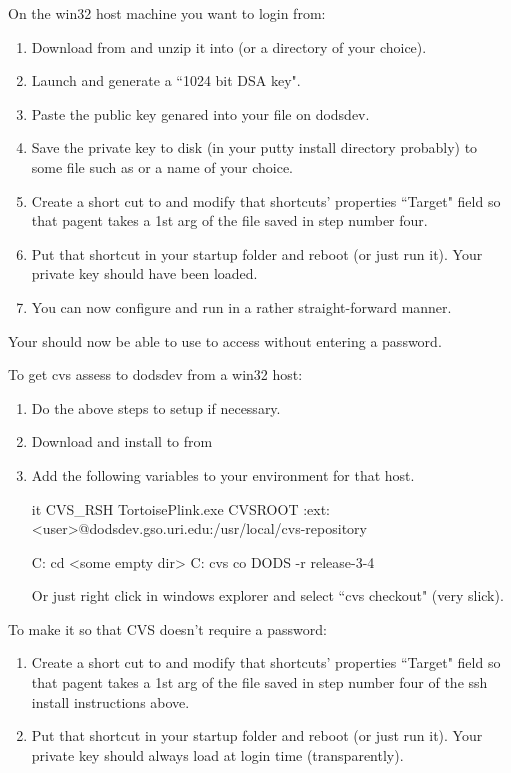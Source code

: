 \documentclass{dods-paper}
\begin{document}
On the win32 host machine you want to login from:
\begin{enumerate}
\item Download  from  and unzip
    it into  (or a directory of your choice).
\item Launch  and generate a ``1024 bit DSA key".
\item Paste the public key genared into your
    file on dodsdev.
\item Save the private key to disk (in your putty install directory
    probably) to some file such as  or a
    name of your choice.
\item Create a short cut to  and modify that shortcuts'
    properties ``Target" field so that pagent takes a 1st arg
    of the file saved in step number four.
\item Put that shortcut in your startup folder and reboot
    (or just run it).  Your private key should have been
    loaded.
\item You can now configure and run  in a rather
    straight-forward manner.
\end{enumerate}

Your should now be able to use  to access 
without entering a password.

To get cvs assess to dodsdev from a win32 host:
\begin{enumerate}
\item Do the above steps to setup  if necessary.
\item Download and install to  from
\item Add the following variables to your environment for that
    host.
    \begin{vcode}{it}
    CVS_RSH      TortoisePlink.exe
    CVSROOT      :ext:<user>@dodsdev.gso.uri.edu:/usr/local/cvs-repository

    C:\> cd <some empty dir>
    C:\> cvs co DODS -r release-3-4
    \end{vcode}
    Or just right click in windows explorer and select ``cvs checkout"
    (very slick).
\end{enumerate}

To make it so that CVS doesn't require a password:
\begin{enumerate}
\item Create a short cut to  and modify that shortcuts'
    properties ``Target" field so that pagent takes a 1st arg
    of the file saved in step number four of the ssh install instructions
    above.
\item Put that shortcut in your startup folder and reboot
    (or just run it).  Your private key should always load
    at login time (transparently).
\end{enumerate}
\end{document}
